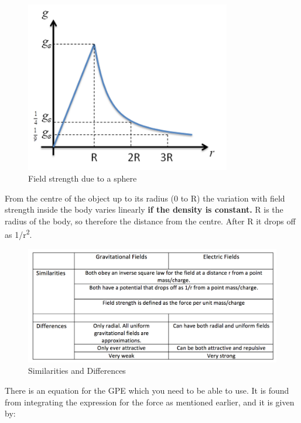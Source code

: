 \documentclass[main.tex]{subfiles}
\begin{document}
\begin{figure}[h]
  \includegraphics[width=0.8\textwidth]{figs/chapt-13/image3.png}
  \caption{Field strength due to a sphere}
  \label{}
\end{figure}

From the centre of the object up to its radius (0 to R) the variation
with field strength inside the body varies linearly \textbf{if the
density is constant.} R is the radius of the body, so therefore the
distance from the centre. After R it drops off as
1/r\textsuperscript{2}.
\newpage
{}

\begin{figure}[h]
  \includegraphics[width=\textwidth]{figs/chapt-13/table.png}
  \caption{Similarities and Differences}
  \label{tab:sim}
\end{figure}


There is an equation for the GPE which you need to be able to use. It is
found from integrating the expression for the force as mentioned
earlier, and it is given by:
\end{document}
